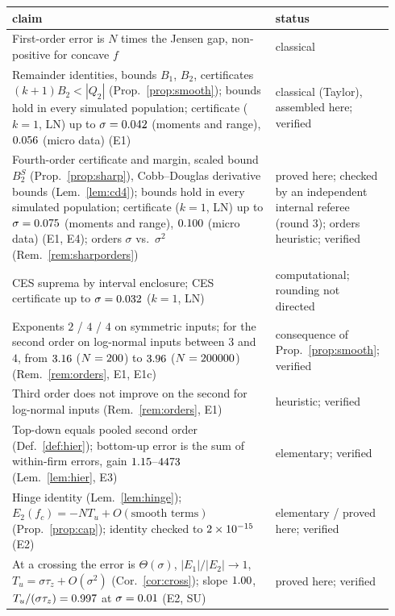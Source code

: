 \documentclass[10pt,a4paper]{article}
\theoremstyle{plain}
\theoremstyle{definition}
\theoremstyle{remark}
\newcommand{\Tu}{T_u}
\begin{document}
\begin{table}[t]
\centering\scriptsize
\begin{tabular}{p{0.67\linewidth}p{0.27\linewidth}}
\toprule
claim & status\\
\midrule
First-order error is $N$ times the Jensen gap, non-positive for concave $f$ & classical\\
Remainder identities, bounds $B_1$, $B_2$, certificates $(k+1)B_2<|Q_2|$ (Prop.~\ref{prop:smooth}); bounds hold in every simulated population; certificate ($k=1$, LN) up to $\sigma=0.042$ (moments and range), $0.056$ (micro data) (E1) & classical (Taylor), assembled here; verified\\
Fourth-order certificate and margin, scaled bound $B_2^S$ (Prop.~\ref{prop:sharp}), Cobb--Douglas derivative bounds (Lem.~\ref{lem:cd4}); bounds hold in every simulated population; certificate ($k=1$, LN) up to $\sigma=0.075$ (moments and range), $0.100$ (micro data) (E1, E4); orders $\sigma$ vs.\ $\sigma^2$ (Rem.~\ref{rem:sharporders}) & proved here; checked by an independent internal referee (round 3); orders heuristic; verified\\
CES suprema by interval enclosure; CES certificate up to $\sigma=0.032$ ($k=1$, LN) & computational; rounding not directed\\
Exponents $2$ / $4$ / $4$ on symmetric inputs; for the second order on log-normal inputs between $3$ and $4$, from $3.16$ ($N=200$) to $3.96$ ($N=200000$) (Rem.~\ref{rem:orders}, E1, E1c) & consequence of Prop.~\ref{prop:smooth}; verified\\
Third order does not improve on the second for log-normal inputs (Rem.~\ref{rem:orders}, E1) & heuristic; verified\\
Top-down equals pooled second order (Def.~\ref{def:hier}); bottom-up error is the sum of within-firm errors, gain $1.15$--$4473$ (Lem.~\ref{lem:hier}, E3) & elementary; verified\\
Hinge identity (Lem.~\ref{lem:hinge}); $E_2(f_c)=-N\Tu+O(\text{smooth terms})$ (Prop.~\ref{prop:cap}); identity checked to $2\times 10^{-15}$ (E2) & elementary / proved here; verified\\
At a crossing the error is $\Theta(\sigma)$, $|E_1|/|E_2|\to1$, $\Tu=\sigma\tau_z+O(\sigma^2)$ (Cor.~\ref{cor:cross}); slope $1.00$, $\Tu/(\sigma\tau_z)=\EtwoTauSU$ at $\sigma=0.01$ (E2, SU) & proved here; verified\\

\end{tabular}
\end{table}
\end{document}
